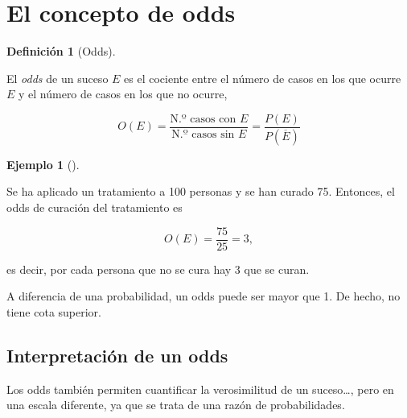 \documentclass[
  spanish,
  a4paper,
]{scrreport}
\theoremstyle{definition}
\newtheorem{definition}{Definición}[chapter]
\theoremstyle{definition}
\newtheorem{example}{Ejemplo}[chapter]
\theoremstyle{remark}
\begin{document}
\section{El concepto de odds}\label{el-concepto-de-odds}

\begin{definition}[Odds]\protect\hypertarget{def-odds}{}\label{def-odds}

El \emph{odds} de un suceso \(E\) es el cociente entre el número de
casos en los que ocurre \(E\) y el número de casos en los que no ocurre,

\[O(E)=\frac{\mbox{N.º casos con $E$}}{\mbox{N.º casos sin $E$}}=\frac{P(E)}{P(\overline E)}\]

\end{definition}

\begin{example}[]\protect\hypertarget{exm-odds}{}\label{exm-odds}

Se ha aplicado un tratamiento a 100 personas y se han curado 75.
Entonces, el odds de curación del tratamiento es

\[O(E) = \frac{75}{25} = 3,\]

es decir, por cada persona que no se cura hay 3 que se curan.

\end{example}

\begin{tcolorbox}[enhanced jigsaw, arc=.35mm, bottomrule=.15mm, bottomtitle=1mm, breakable, colback=white, colbacktitle=quarto-callout-warning-color!10!white, colframe=quarto-callout-warning-color-frame, coltitle=black, left=2mm, leftrule=.75mm, opacityback=0, opacitybacktitle=0.6, rightrule=.15mm, title=\textcolor{quarto-callout-warning-color}{\faExclamationTriangle}\hspace{0.5em}{Advertencia}, titlerule=0mm, toprule=.15mm, toptitle=1mm]

A diferencia de una probabilidad, un odds puede ser mayor que 1. De
hecho, no tiene cota superior.

\end{tcolorbox}

\subsection{Interpretación de un
odds}\label{interpretaciuxf3n-de-un-odds}

Los odds también permiten cuantificar la verosimilitud de un
suceso\ldots, pero en una escala diferente, ya que se trata de una razón
de probabilidades.
\end{document}

